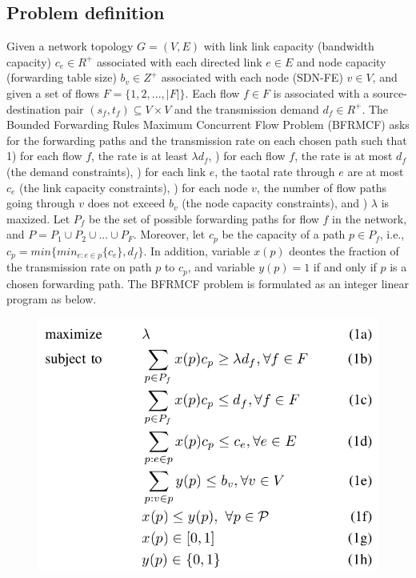 \documentclass[a4paper,12pt]{report}
\begin{document}
\begin{large}
    \subsection{Problem definition}
    \qquad Given a network topology $G=(V, E)$ with link link capacity (bandwidth capacity) $c_e\in R^+$ associated with each directed link $e\in E$ and node capacity (forwarding table size) $b_v\in Z^+$ associated with each node (SDN-FE) $v\in V$, and given a set of flows $F=\{ 1, 2, ..., |F|\}$. Each flow $f\in F$ is associated with a source-destination pair $ \left( s_f,t_f \right)\subseteq V \times V $ and the transmission demand $d_f \in R^+$. The Bounded Forwarding Rules Maximum Concurrent Flow Problem (BFRMCF) asks for the forwarding paths and the transmission rate on each chosen path such that 1) for each flow $f$, the rate is at least $\lambda d_f$, ) for each flow $f$, the rate is at most $d_f$ (the demand constraints), ) for each link $e$, the taotal rate through $e$ are at most $c_e$ (the link capacity constraints), ) for each node $v$, the number of flow paths going through $v$ does not exceed $b_v$ (the node capacity constraints), and ) $\lambda$ is maxized. \newline\null
\qquad Let $P_f$ be the set of possible forwarding paths for flow $f$ in the network, and $P=P_1 \cup P_2 \cup ... \cup P_F$. Moreover, let $c_p$ be the capacity of a path $p \in P_f$, i.e., $c_p = min\{ min_{e:e\in p} \{ c_e \}, d_f\}$. In addition, variable $x\left( p \right)$ deontes the fraction of the transmission rate on path $p$ to $c_p$, and variable $y\left( p \right) = 1$ if and only if $p$ is a chosen forwarding path. The BFRMCF problem is formulated as an integer linear program as below.
			\begin{figure}
	          \centering
	            \includegraphics[width=1.0\textwidth]{it_program.png}
	      	\end{figure}

\end{large}
\end{document}
